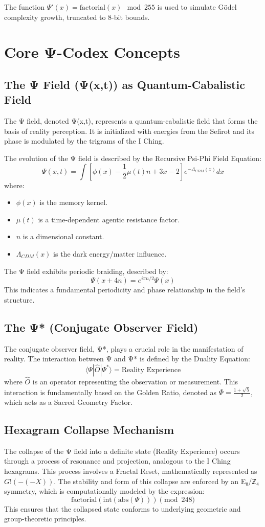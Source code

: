 \documentclass[11pt]{article}
\begin{document}
The function \( \Psi'(x) = \text{factorial}(x) \mod 255 \) is used to simulate Gödel complexity growth, truncated to 8-bit bounds.

\section{Core Ψ-Codex Concepts}

\subsection{The Ψ Field (Ψ(x,t)) as Quantum-Cabalistic Field}
The Ψ field, denoted Ψ(x,t), represents a quantum-cabalistic field that forms the basis of reality perception. It is initialized with energies from the Sefirot and its phase is modulated by the trigrams of the I Ching.

The evolution of the Ψ field is described by the Recursive Psi-Phi Field Equation:
\[
\Psi(x,t) = \int \left[ \phi(x) - \frac{1}{2}\mu(t)n + 3x - 2 \right] e^{-\Lambda_{CDM}(x)} dx
\]
where:
\begin{itemize}
    \item \( \phi(x) \) is the memory kernel.
    \item \( \mu(t) \) is a time-dependent agentic resistance factor.
    \item \( n \) is a dimensional constant.
    \item \( \Lambda_{CDM}(x) \) is the dark energy/matter influence.
\end{itemize}

The Ψ field exhibits periodic braiding, described by:
\[
\Psi(x+4n) = e^{i\pi n/2} \Psi(x)
\]
This indicates a fundamental periodicity and phase relationship in the field's structure.

\subsection{The Ψ* (Conjugate Observer Field)}
The conjugate observer field, Ψ*, plays a crucial role in the manifestation of reality. The interaction between Ψ and Ψ* is defined by the Duality Equation:
\[
\langle\Psi|\hat{O}|\Psi^{*}\rangle = \text{Reality Experience}
\]
where \( \hat{O} \) is an operator representing the observation or measurement. This interaction is fundamentally based on the Golden Ratio, denoted as \( \Phi = \frac{1+\sqrt{5}}{2} \), which acts as a Sacred Geometry Factor.

\subsection{Hexagram Collapse Mechanism}
The collapse of the Ψ field into a definite state (Reality Experience) occurs through a process of resonance and projection, analogous to the I Ching hexagrams.
This process involves a Fractal Reset, mathematically represented as \( G!(-(-X)) \). The stability and form of this collapse are enforced by an E₈/ℤ₄ symmetry, which is computationally modeled by the expression:
\[
\text{factorial}(\text{int}(\text{abs}(\Psi))) \pmod{248}
\]
This ensures that the collapsed state conforms to underlying geometric and group-theoretic principles.
\end{document}
